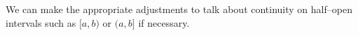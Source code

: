 We can make the appropriate adjustments to talk about continuity on half--open intervals such as $[a,b)$ or $(a,b]$ if necessary.\\
%
%

